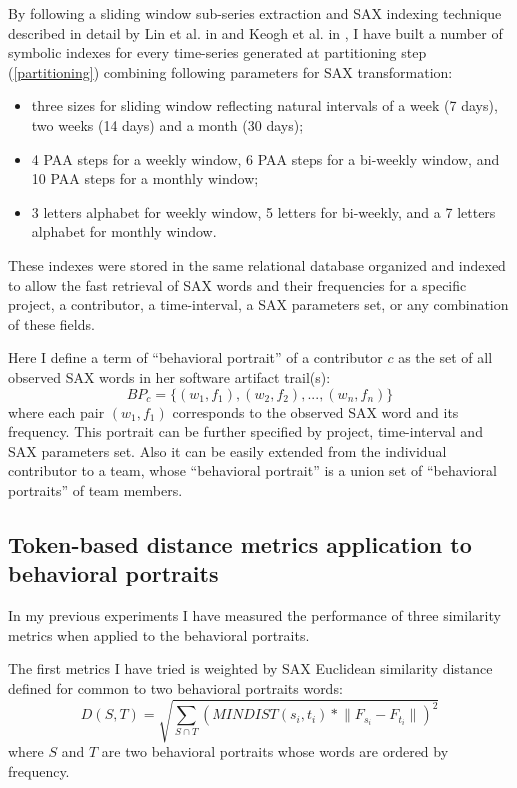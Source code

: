 \documentclass[conference]{IEEEtran}
\begin{document}
By following a sliding window sub-series extraction and SAX indexing technique described 
in detail by Lin et al. in \cite{citeulike:2821475} and Keogh et al. in 
\cite{citeulike:532335}, I have built a number of symbolic indexes for every time-series 
generated at partitioning step (\ref{partitioning}) combining following parameters for 
SAX transformation: 
\begin{itemize}
 \item three sizes for sliding window reflecting natural intervals of a week (7 days), 
      two weeks (14 days) and a month (30 days);
 \item 4 PAA steps for a weekly window, 6 PAA steps for a bi-weekly window,
      and 10 PAA steps for a monthly window;
 \item 3 letters alphabet for weekly window, 5 letters for bi-weekly,
      and a 7 letters alphabet for monthly window.
\end{itemize}

These indexes were stored in the same relational database organized and indexed to allow the fast 
retrieval of SAX words and their frequencies for a specific project, 
a contributor, a time-interval, a SAX parameters set, or any combination of these fields. 

Here I define a term of ``behavioral portrait'' of a contributor $c$ as the set of all observed SAX words 
in her software artifact trail(s):
\begin{equation}
 BP_{c} = \{ (w_{1},f_{1}), (w_{2},f_{2}), ..., (w_{n},f_{n}) \}
\end{equation}
where each pair $(w_{1},f_{1})$ corresponds to the observed SAX word and its frequency. This portrait can
be further specified by project, time-interval and SAX parameters set. Also it can be easily extended 
from the individual contributor to a team, whose ``behavioral portrait'' is a union set
of ``behavioral portraits'' of team members.

\subsection{Token-based distance metrics application to behavioral portraits}
In my previous experiments I have measured the performance of three similarity metrics 
when applied to the behavioral portraits. 

The first metrics I have tried is weighted by SAX Euclidean similarity distance defined for common to two 
behavioral portraits words:
\begin{equation}
D(S,T) = \sqrt{ \sum_{S\cap T} (MINDIST(s_{i},t_{i}) * \lVert F_{s_{i}}-F_{t_{i}} \rVert )^{2}  }
\end{equation} 
where $S$ and $T$ are two behavioral portraits whose words are ordered by frequency.
\end{document}
